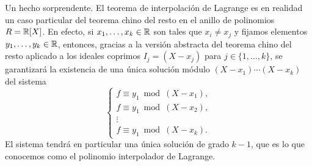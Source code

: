 Un hecho sorprendente. El teorema de interpolación de Lagrange es en realidad un caso particular del teorema chino del resto en el anillo de polinomios $R=\mathbb{R}[X]$. En efecto,
si $x_1,\dots,x_k\in\mathbb{R}$ son tales que $x_i\ne x_j$ y fijamos elementos $y_1,\dots,y_k\in\mathbb{R}$, entonces, gracias a la versión abstracta del teorema chino del resto aplicado
a los ideales coprimos $I_j=(X-x_j)$ para $j\in\{1,\dots,k\}$, se garantizará la existencia de una única solución 
módulo $(X-x_1)\cdots (X-x_k)$ del sistema
\[
\begin{cases}
f\equiv y_1\bmod (X-x_1),\\
f\equiv y_1\bmod (X-x_2),\\
\vdots\\
f\equiv y_1\bmod (X-x_k).	
\end{cases}
\]
El sistema tendrá en particular una única solución de grado $k-1$, 
que es lo que conocemos como el polinomio interpolador de Lagrange.

